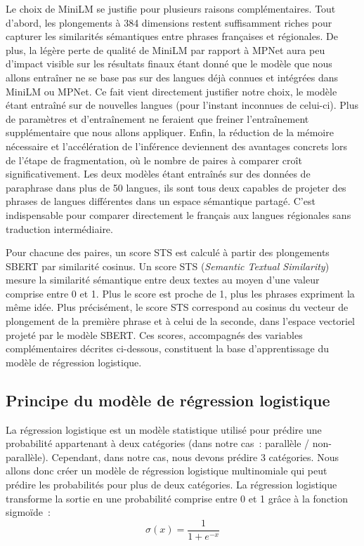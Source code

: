 Le choix de MiniLM se justifie pour plusieurs raisons complémentaires. Tout d'abord,
les plongements à 384 dimensions restent suffisamment riches pour capturer les similarités sémantiques
entre phrases françaises et régionales. De plus, la légère perte de qualité de MiniLM par rapport à MPNet
aura peu d'impact visible sur les résultats finaux étant donné que le modèle que nous allons entraîner ne se
base pas sur des langues déjà connues et intégrées dans MiniLM ou MPNet. Ce fait vient directement justifier notre
choix, le modèle étant entraîné sur de nouvelles langues (pour l'instant inconnues de celui-ci). Plus de paramètres
et d'entraînement ne feraient que freiner l'entraînement supplémentaire que nous allons appliquer.
Enfin, la réduction de la mémoire nécessaire et l'accélération de l'inférence deviennent des avantages
concrets lors de l'étape de fragmentation, où le nombre de paires à comparer croît significativement.
Les deux modèles étant entraînés sur des données de paraphrase dans plus de 50 langues,
ils sont tous deux capables de projeter des phrases de langues différentes dans un espace sémantique partagé.
C'est indispensable pour comparer directement le français aux langues régionales sans traduction
intermédiaire.

Pour chacune des paires, un score STS est calculé à partir des
plongements SBERT par similarité cosinus.
Un score STS (\textit{Semantic Textual Similarity}) mesure la similarité sémantique entre deux textes
au moyen d'une valeur comprise entre 0 et 1. Plus le score est proche de 1, plus les phrases
expriment la même idée. Plus précisément, le score STS correspond au cosinus
du vecteur de plongement de la première phrase et à celui de la seconde, dans l'espace
vectoriel projeté par le modèle SBERT.
Ces scores, accompagnés des variables complémentaires décrites ci-dessous,
constituent la base d'apprentissage du modèle de régression logistique.

\newpage

\subsection{Principe du modèle de régression logistique}

La régression logistique est un modèle statistique utilisé pour prédire une probabilité appartenant à deux
catégories (dans notre cas~: parallèle / non-parallèle). Cependant, dans notre cas, nous devons prédire 3 catégories.
Nous allons donc créer un modèle de régression logistique multinomiale qui peut prédire les probabilités pour plus
de deux catégories. La régression logistique transforme la sortie en une
probabilité comprise entre 0 et 1 grâce à la fonction sigmoïde~:
\[
\sigma(x) = \frac{1}{1 + e^{-x}}
\]


